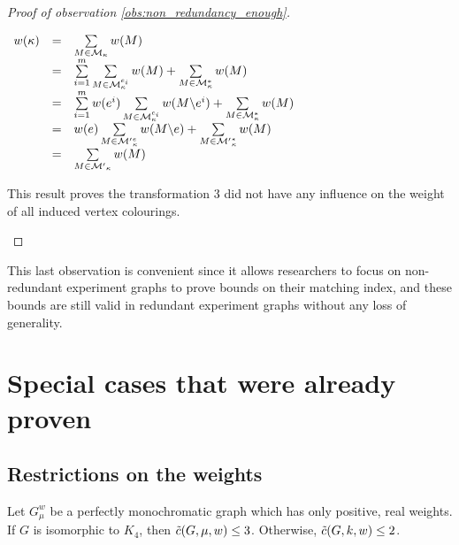 \begin{proof}[Proof of observation \ref{obs:non_redundancy_enough}]
\begin{enumerate}
            \begin{center}
                $\begin{array}{r c l}
                    w(\kappa) & = & \sum\limits_{M \in \mathcal{M}_\kappa} w(M)  \\
                              & = & \sum\limits_{i = 1}^m \sum\limits_{M \in \mathcal{M}_\kappa^{e_i}} w(M) + \sum\limits_{M \in \mathcal{M}_\kappa^{*}} w(M) \\
                              & = & \sum\limits_{i = 1}^m w(e^i) \sum\limits_{M \in \mathcal{M}_\kappa^{e_i}} w(M \backslash e^i) + \sum\limits_{M \in \mathcal{M}_\kappa^{*}} w(M) \\
                              & = & w(e) \sum\limits_{M \in \mathcal{M'}_\kappa^{e}} w(M \backslash e) + \sum\limits_{M \in \mathcal{M'}_\kappa^{*}} w(M) \\
                              & = & \sum\limits_{M \in \mathcal{M'}_\kappa} w(M)
                \end{array}$
            \end{center}

            This result proves the transformation 3 did not have any influence on the weight of all induced vertex colourings.
    \end{enumerate}
\end{proof}

This last observation is convenient since it allows researchers to focus on non-redundant experiment graphs to prove bounds on their matching index, and these bounds are still valid in redundant experiment graphs without any loss of generality.


\section{Special cases that were already proven}
\label{sec:proved-special-cases}

\subsection{Restrictions on the weights}
\label{subsec:proved-special-cases-weights}

\begin{lemma}
    \label{lem:real_pos_weights}
    Let $G_\mu^w$ be a perfectly monochromatic graph which has only positive, real weights.
    If $G$ is isomorphic to $K_4$, then $\Tilde{c}(G, \mu, w) \leq 3$.
    Otherwise, $\Tilde{c}(G, k, w) \leq 2$.
\end{lemma}

